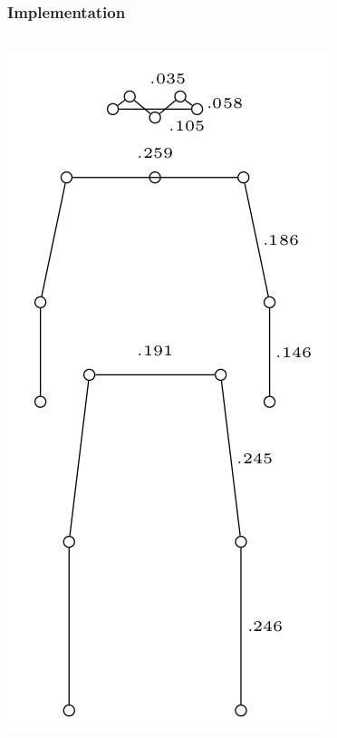 \documentclass[xcolor=pdftex,dvipsnames,table]{beamer}
\begin{document}
\begin{frame}
  \frametitle{Implementation}
  \begin{columns}[c]
    \includegraphics[width=\linewidth]{graphics/constraints}

\end{columns}
\end{frame}
\end{document}
